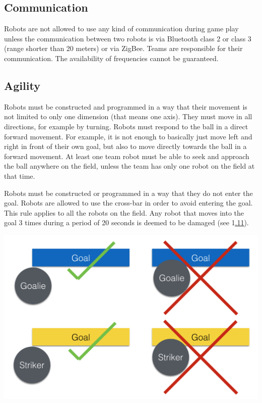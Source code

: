 \documentclass{article}
\begin{document}
\subsection{ Communication \label{ref-022}}

Robots are not allowed to use any kind of communication during game play unless the communication between two robots is via Bluetooth class 2 or class 3 (range shorter than 20 meters) or via ZigBee. Teams are responsible for their communication. The availability of frequencies cannot be guaranteed.

\subsection{ Agility \label{ref-023}}

Robots must be constructed and programmed in a way that their movement is not limited to only one dimension (that means one axis). They must move in all directions, for example by turning. Robots must respond to the ball in a direct forward movement. For example, it is not enough to basically just move left and right in front of their own goal, but also to move directly towards the ball in a forward movement. At least one team robot must be able to seek and approach the ball anywhere on the field, unless the team has only one robot on the field at that time.

Robots must be constructed or programmed in a way that they do not enter the goal. Robots are allowed to use the cross-bar in order to avoid entering the goal. This rule applies to all the robots on the field. Any robot that moves into the goal 3 times during a period of 20 seconds is deemed to be damaged (see 1\underline{{\hyperref[ref-012]{.11}}}).

\includegraphics[width=1\textwidth]{media/image3.png}
\end{document}
